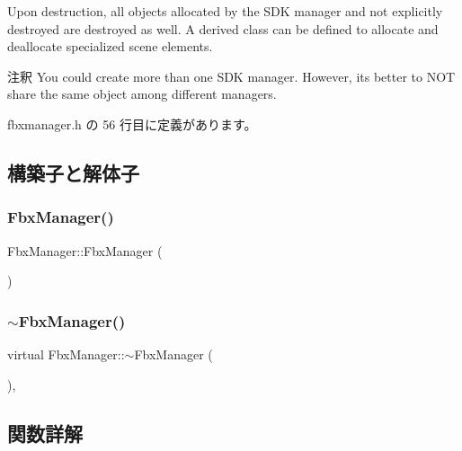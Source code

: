 Upon destruction, all objects allocated by the S\+DK manager and not explicitly destroyed are destroyed as well. A derived class can be defined to allocate and deallocate specialized scene elements. \begin{DoxyRemark}{注釈}
You could create more than one S\+DK manager. However, it\textquotesingle{}s better to N\+OT share the same object among different managers. 
\end{DoxyRemark}


 fbxmanager.\+h の 56 行目に定義があります。



\subsection{構築子と解体子}
\mbox{\label{class_fbx_manager_ab7b188ec0c92172140883e2be38e1a4a}} 
\subsubsection{\texorpdfstring{Fbx\+Manager()}{FbxManager()}}
{\footnotesize\ttfamily Fbx\+Manager\+::\+Fbx\+Manager (\begin{DoxyParamCaption}{ }\end{DoxyParamCaption})\hspace{0.3cm}{\ttfamily [protected]}}

\mbox{\label{class_fbx_manager_a37045bda50435f908719b9e45b79ddbd}} 
\subsubsection{\texorpdfstring{$\sim$\+Fbx\+Manager()}{~FbxManager()}}
{\footnotesize\ttfamily virtual Fbx\+Manager\+::$\sim$\+Fbx\+Manager (\begin{DoxyParamCaption}{ }\end{DoxyParamCaption})\hspace{0.3cm}{\ttfamily [protected]}, {\ttfamily [virtual]}}



\subsection{関数詳解}
\mbox{\label{class_fbx_manager_adf2f27440cd29bed880f944a0f83831b}} 
